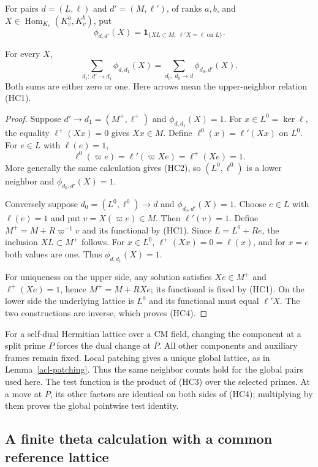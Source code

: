 For pairs $d=(L,\ell)$ and $d'=(M,\ell')$, of ranks $a,b$, and
$X\in\operatorname{Hom}_{K_v}(K_v^a,K_v^b)$, put
\[
 \phi_{d,d'}(X)=
  \mathbf1_{\{XL\subset M,\ \ell'X=\ell\text{ on }L\}}.
 \tag{HC3}
\]

\begin{proposition}\label{hec-local-count}
For every $X$,
\[
 \sum_{d_1:\ d'\to d_1}\phi_{d,d_1}(X)
       =\sum_{d_0:\ d_0\to d}\phi_{d_0,d'}(X).
 \tag{HC4}
\]
Both sums are either zero or one. Here arrows mean the upper-neighbor
relation (HC1).
\end{proposition}
\begin{proof}
Suppose $d'\to d_1=(M^+,\ell^+)$ and $\phi_{d,d_1}(X)=1$.
For $x\in L^0=\ker\ell$, the equality $\ell^+(Xx)=0$ gives
$Xx\in M$. Define $\ell^0(x)=\ell'(Xx)$ on $L^0$.
For $e\in L$ with $\ell(e)=1$,
\[
 \ell^0(\varpi e)=\ell'(\varpi Xe)=\ell^+(Xe)=1.
\]
More generally the same calculation gives (HC2), so $(L^0,\ell^0)$
is a lower neighbor and $\phi_{d_0,d'}(X)=1$.

Conversely suppose $d_0=(L^0,\ell^0)\to d$ and
$\phi_{d_0,d'}(X)=1$. Choose $e\in L$ with $\ell(e)=1$ and put
$v=X(\varpi e)\in M$. Then $\ell'(v)=1$. Define $M^+=M+R\varpi^{-1}v$
and its functional by (HC1). Since $L=L^0+Re$, the inclusion
$XL\subset M^+$ follows. For $x\in L^0$, $\ell^+(Xx)=0=\ell(x)$,
and for $x=e$ both values are one. Thus $\phi_{d,d_1}(X)=1$.

For uniqueness on the upper side, any solution satisfies
$Xe\in M^+$ and $\ell^+(Xe)=1$, hence $M^+=M+RXe$;
its functional is fixed by (HC1). On the lower side the underlying
lattice is $L^0$ and its functional must equal $\ell'X$.
The two constructions are inverse, which proves (HC4).
\end{proof}

For a self-dual Hermitian lattice over a CM field, changing the
component at a split prime $P$ forces the dual change at $\bar P$.
All other components and auxiliary frames remain fixed. Local patching
gives a unique global lattice, as in Lemma~\ref{acl-patching}.
Thus the same neighbor counts hold for the global pairs used here.
The test function is the product of (HC3) over the selected primes.
At a move at $P$, its other factors are identical on both sides of
(HC4); multiplying by them proves the global pointwise test identity.

\subsection{A finite theta calculation with a common reference lattice}

